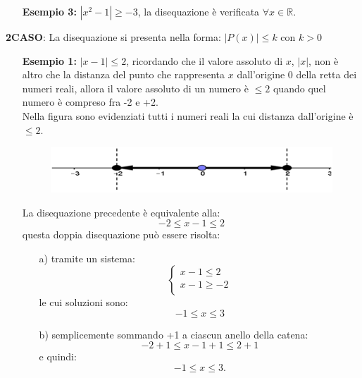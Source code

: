 \begin{enumerate}
        \item [\textbf{Esempio 3:}] $|x^2-1|\geq -3$, la disequazione è 
verificata $\forall x \in \mathbb{R}$.
        
\end{enumerate}

\textbf{2\textdegree CASO}: La disequazione si presenta nella forma:  
$|P(x)|\leq k$ con $k> 0$\\

\begin{enumerate}
        \item [\textbf{Esempio 1:}] $|x-1|\leq 2$, ricordando che il valore 
assoluto di $x$, $|x|$, non è altro che la distanza del punto che rappresenta 
$x$ dall'origine 0 della retta dei numeri reali, allora il valore assoluto di 
un 
numero è $\leq 2$ quando quel numero è compreso fra -2 e +2.\\
        Nella figura sono evidenziati tutti i numeri reali la cui distanza 
dall'origine è $\leq 2$.

\begin{figure}[h]
\begin{inaccessibleblock}[TODO]
\centering
\includegraphics[width=0.9\linewidth]{img/imm4} %
\end{inaccessibleblock}
\label{fig:abs_imm4}
\end{figure}

        La disequazione precedente è equivalente alla:
        $$-2\leq x-1 \leq 2$$
        questa doppia disequazione può essere risolta:
        \begin{enumerate}
                \item [a)] tramite un sistema:
                $$
                \left\lbrace 
                \begin{array}{l}
                x-1\leq 2\\
                x-1\geq -2\\
                \end{array}
                \right.
                $$
                le cui soluzioni sono:
                $$-1\leq x \leq 3$$
                        \item [b)] semplicemente sommando +1 a ciascun anello 
della catena:
                        $$-2+1\leq x-1+1 \leq 2+1$$
                        e quindi:
                        $$-1\leq x \leq 3.$$
        \end{enumerate}
        
\end{enumerate}

